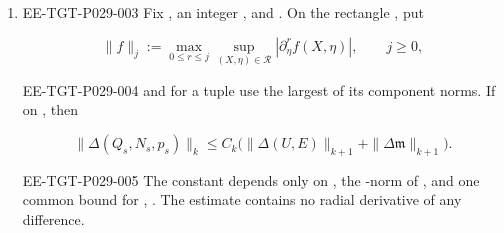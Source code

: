 \begin{lemma}
\begin{enumerate}[label=\textup{(\roman*)},leftmargin=2.5em]
\item
\begin{EESegment}{EE-TGT-P029-003}
Fix , an integer
, and . On the
rectangle , put
\end{EESegment}
\[
 \|f\|_j:=\max_{0\leq r\leq j}
           \sup_{(X,\eta)\in\mathcal R}|\partial_\eta^rf(X,\eta)|,
 \qquad j\geq0,
\]
\begin{EESegment}{EE-TGT-P029-004}
and for a tuple use the largest of its component norms. If
 on
, then
\end{EESegment}
\begin{equation}
 \|\Delta(Q_s,N_s,p_s)\|_k
 \leq C_k\bigl(\|\Delta(U,E)\|_{k+1}
                 +\|\Delta\mathfrak m\|_{k+1}\bigr).
\tag{4.17}\label{eq:4.17}
\end{equation}
\begin{EESegment}{EE-TGT-P029-005}
The constant  depends only on
, the
-norm of
, and one common bound for
,
. The estimate contains no radial derivative of
any difference.
\end{EESegment}
\end{enumerate}
\end{lemma}

